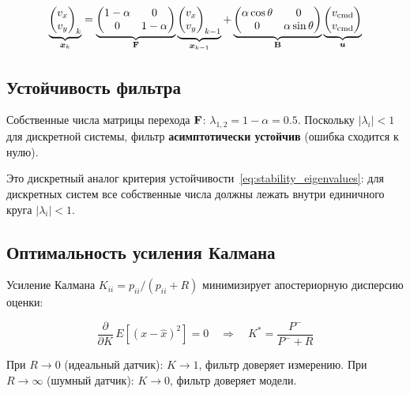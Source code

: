 \begin{equation}
  \underbrace{\begin{pmatrix} v_x \\ v_y \end{pmatrix}_{k}}_{\bm{x}_k}
  = \underbrace{\begin{pmatrix} 1-\alpha & 0 \\ 0 & 1-\alpha \end{pmatrix}}_{\mathbf{F}}
  \underbrace{\begin{pmatrix} v_x \\ v_y \end{pmatrix}_{k-1}}_{\bm{x}_{k-1}}
  + \underbrace{\begin{pmatrix} \alpha\cos\theta & 0 \\ 0 & \alpha\sin\theta \end{pmatrix}}_{\mathbf{B}}
  \underbrace{\begin{pmatrix} v_{\text{cmd}} \\ v_{\text{cmd}} \end{pmatrix}}_{\bm{u}}
  \label{eq:vekf_ss}
\end{equation}

\subsection{Устойчивость фильтра}

Собственные числа матрицы перехода $\mathbf{F}$:
$\lambda_{1,2} = 1 - \alpha = 0.5$.
Поскольку $|\lambda_i| < 1$ для дискретной системы,
фильтр \textbf{асимптотически устойчив} (ошибка сходится к нулю).

Это дискретный аналог критерия устойчивости~\eqref{eq:stability_eigenvalues}:
для дискретных систем все собственные числа должны лежать
внутри единичного круга $|\lambda_i| < 1$.

\subsection{Оптимальность усиления Калмана}

Усиление Калмана $K_{ii} = p_{ii}/(p_{ii} + R)$
минимизирует апостериорную дисперсию оценки:

\begin{equation}
  \frac{\partial}{\partial K}\,E\!\left[(x - \hat{x})^2\right] = 0
  \quad\Rightarrow\quad K^* = \frac{P^-}{P^- + R}
  \label{eq:optimal_K}
\end{equation}

При $R \to 0$ (идеальный датчик): $K \to 1$, фильтр доверяет измерению.
При $R \to \infty$ (шумный датчик): $K \to 0$, фильтр доверяет модели.

